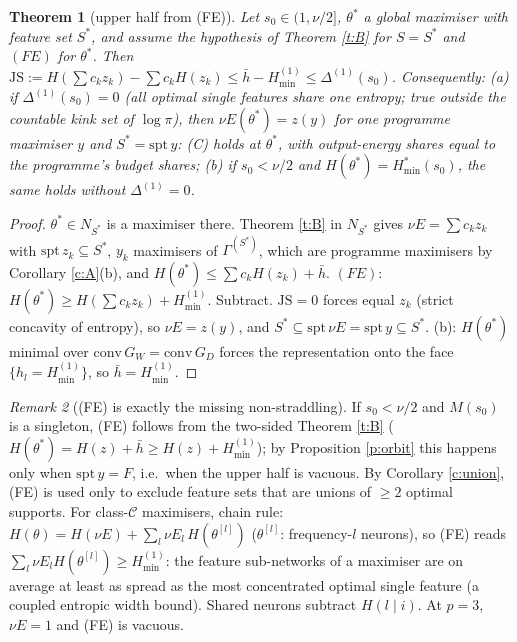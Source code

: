 \documentclass[11pt]{article}
\newtheorem{theorem}{Theorem}\newtheorem{lemma}[theorem]{Lemma}\newtheorem{proposition}[theorem]{Proposition}
\theoremstyle{remark}\newtheorem{remark}[theorem]{Remark}
\begin{document}
\begin{theorem}[upper half from (FE)]\label{t:C}
Let $s_0\in(1,\nu/2]$, $\theta^*$ a global maximiser with feature set $S^*$, and assume the hypothesis of Theorem \ref{t:B} for
$S=S^*$ and $(FE)$ for $\theta^*$. Then $\mathrm{JS}:=H(\sum c_kz_k)-\sum c_kH(z_k)\le\bar h-H^{(1)}_{\min}\le\Delta^{(1)}(s_0)$. Consequently:
(a) if $\Delta^{(1)}(s_0)=0$ (all optimal single features share one entropy; true outside the countable kink set of $\log\pi$),
then $\nu E(\theta^*)=z(y)$ for one programme maximiser $y$ and $S^*=\mathrm{spt}\,y$: (C) holds at $\theta^*$, with output-energy
shares equal to the programme's budget shares;
(b) if $s_0<\nu/2$ and $H(\theta^*)=H^*_{\min}(s_0)$, the same holds without $\Delta^{(1)}=0$.
\end{theorem}
\begin{proof}
$\theta^*\in N_{S^*}$ is a maximiser there. Theorem \ref{t:B} in $N_{S^*}$ gives $\nu E=\sum c_kz_k$ with $\mathrm{spt}\,z_k\subseteq S^*$,
$y_k$ maximisers of $\Gamma^{(S^*)}$, which are programme maximisers by Corollary \ref{c:A}(b), and $H(\theta^*)\le\sum c_kH(z_k)+\bar h$.
$(FE)$: $H(\theta^*)\ge H(\sum c_kz_k)+H^{(1)}_{\min}$. Subtract. $\mathrm{JS}=0$ forces equal $z_k$ (strict concavity of entropy), so
$\nu E=z(y)$, and $S^*\subseteq\mathrm{spt}\,\nu E=\mathrm{spt}\,y\subseteq S^*$. (b): $H(\theta^*)$ minimal over $\mathrm{conv}\,G_W=\mathrm{conv}\,G_D$
forces the representation onto the face $\{h_l=H^{(1)}_{\min}\}$, so $\bar h=H^{(1)}_{\min}$.
\end{proof}

\begin{remark}[(FE) is exactly the missing non-straddling]
If $s_0<\nu/2$ and $M(s_0)$ is a singleton, (FE) follows from the two-sided Theorem \ref{t:B}
($H(\theta^*)=H(z)+\bar h\ge H(z)+H^{(1)}_{\min}$); by Proposition \ref{p:orbit} this happens only when $\mathrm{spt}\,y=F$, i.e.\ when the
upper half is vacuous. By Corollary \ref{c:union}, (FE) is used only to exclude feature sets that are unions of $\ge2$ optimal supports. For class-$\mathcal C$ maximisers, chain rule: $H(\theta)=H(\nu E)+\sum_l\nu E_l\,H(\theta^{[l]})$
($\theta^{[l]}$: frequency-$l$ neurons), so (FE) reads $\sum_l\nu E_lH(\theta^{[l]})\ge H^{(1)}_{\min}$: the feature sub-networks of a
maximiser are on average at least as spread as the most concentrated optimal single feature (a coupled entropic width bound).
Shared neurons subtract $H(l\mid i)$. At $p=3$, $\nu E=1$ and (FE) is vacuous.
\end{remark}
\end{document}
